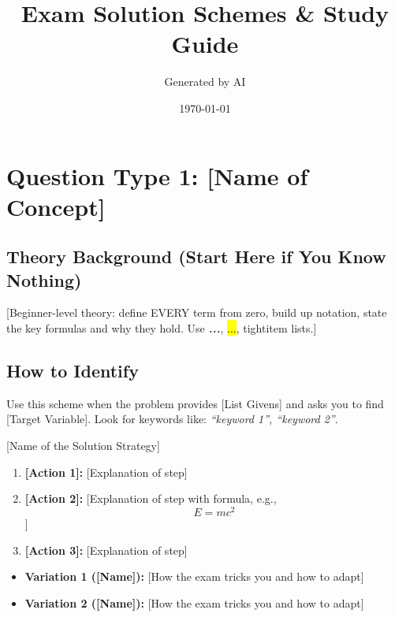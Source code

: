 \documentclass[12pt, a4paper]{article}
\newcommand{\term}[1]{\textbf{\textit{#1}}}        %
\newcommand{\imp}[1]{\hl{#1}}                       %
\begin{document}
\title{Exam Solution Schemes \& Study Guide}
\author{Generated by AI}
\date{\today}
\maketitle
\tableofcontents
\newpage


\section{Question Type 1: [Name of Concept]}

\subsection*{Theory Background (Start Here if You Know Nothing)}
[Beginner-level theory: define EVERY term from zero, build up notation, state the key formulas and why they hold. Use \term{...}, \imp{...}, tightitem lists.]

\begin{theorybox}
\end{theorybox}

\subsection*{How to Identify}
Use this scheme when the problem provides [List Givens] and asks you to find [Target Variable]. Look for keywords like: \textit{``keyword 1'', ``keyword 2''}.

\begin{schemebox}{[Name of the Solution Strategy]}
\begin{enumerate}[label=\textbf{Step \arabic*:}, leftmargin=*]
    \item \textbf{[Action 1]:} [Explanation of step]
    \item \textbf{[Action 2]:} [Explanation of step with formula, e.g., \[E = mc^2\]]
    \item \textbf{[Action 3]:} [Explanation of step]
\end{enumerate}
\end{schemebox}

\begin{trapbox}
\begin{itemize}
    \item \textbf{Variation 1 ([Name]):} [How the exam tricks you and how to adapt]
    \item \textbf{Variation 2 ([Name]):} [How the exam tricks you and how to adapt]
\end{itemize}
\end{trapbox}
\end{document}
